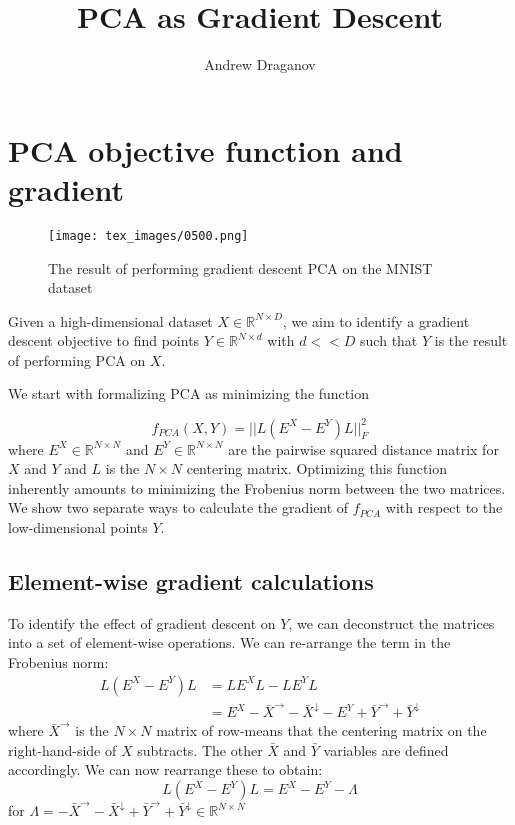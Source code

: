 \documentclass{article}
\title{PCA as Gradient Descent}
\author{Andrew Draganov}
\theoremstyle{definition}
\begin{document}
\maketitle
\section{PCA objective function and gradient}

\begin{figure}
\centering
\texttt{[image: tex\_images/0500.png]}
\caption{The result of performing gradient descent PCA on the MNIST dataset}
\end{figure}

Given a high-dimensional dataset $X \in \mathbb{R}^{N \times D}$, we aim to identify a gradient descent objective to find points $Y \in \mathbb{R}^{N \times d}$
with $d << D$ such that $Y$ is the result of performing PCA on $X$.

We start with formalizing PCA as minimizing the function

\begin{equation}
    f_{PCA}(X, Y) = ||L (E^X - E^Y) L ||^2_F
\end{equation}
where $E^X \in \mathbb{R}^{N \times N}$ and $E^Y \in \mathbb{R}^{N \times N}$ are the pairwise squared distance matrix for $X$ and $Y$ and $L$ is the $N \times N$ centering matrix. Optimizing this function inherently
amounts to minimizing the Frobenius norm between the two matrices. We show two separate ways to calculate the gradient of $f_{PCA}$ with respect to the
low-dimensional points $Y$.

\subsection{Element-wise gradient calculations}

To identify the effect of gradient descent on $Y$, we can deconstruct the matrices into a set of element-wise operations. We can re-arrange the term in the
Frobenius norm:
\begin{align*}
    L (E^X - E^Y) L &= LE^XL - LE^YL \\
    &= E^X - \bar{X}^{\rightarrow} - \bar{X}^{\downarrow} - E^Y + \bar{Y}^{\rightarrow} + \bar{Y}^{\downarrow}
\end{align*}
where $\bar{X}^{\rightarrow}$ is the $N \times N$ matrix of row-means that the centering matrix on the right-hand-side of $X$ subtracts. The other $\bar{X}$ and
$\bar{Y}$ variables are defined accordingly. We can now rearrange these to obtain:
\[ L (E^X - E^Y) L = E^X - E^Y - \Lambda \]
for $\Lambda = - \bar{X}^{\rightarrow} - \bar{X}^{\downarrow} + \bar{Y}^{\rightarrow} + \bar{Y}^{\downarrow} \in \mathbb{R}^{N \times N}$
\end{document}

